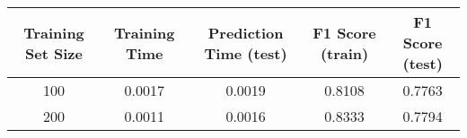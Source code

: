 \documentclass{ctexart}
\begin{document}
\begin{longtable}[]{@{}ccccc@{}}
\toprule
\begin{minipage}[b]{0.16\columnwidth}\centering\strut
Training Set Size\strut
\end{minipage} & \begin{minipage}[b]{0.21\columnwidth}\centering\strut
Training Time\strut
\end{minipage} & \begin{minipage}[b]{0.20\columnwidth}\centering\strut
Prediction Time (test)\strut
\end{minipage} & \begin{minipage}[b]{0.15\columnwidth}\centering\strut
F1 Score (train)\strut
\end{minipage} & \begin{minipage}[b]{0.14\columnwidth}\centering\strut
F1 Score (test)\strut
\end{minipage}\tabularnewline
\midrule
\endhead
\begin{minipage}[t]{0.16\columnwidth}\centering\strut
100\strut
\end{minipage} & \begin{minipage}[t]{0.21\columnwidth}\centering\strut
0.0017\strut
\end{minipage} & \begin{minipage}[t]{0.20\columnwidth}\centering\strut
0.0019\strut
\end{minipage} & \begin{minipage}[t]{0.15\columnwidth}\centering\strut
0.8108\strut
\end{minipage} & \begin{minipage}[t]{0.14\columnwidth}\centering\strut
0.7763\strut
\end{minipage}\tabularnewline
\begin{minipage}[t]{0.16\columnwidth}\centering\strut
200\strut
\end{minipage} & \begin{minipage}[t]{0.21\columnwidth}\centering\strut
0.0011\strut
\end{minipage} & \begin{minipage}[t]{0.20\columnwidth}\centering\strut
0.0016\strut
\end{minipage} & \begin{minipage}[t]{0.15\columnwidth}\centering\strut
0.8333\strut
\end{minipage} & \begin{minipage}[t]{0.14\columnwidth}\centering\strut
0.7794\strut
\end{minipage}\tabularnewline

\end{longtable}
\end{document}
